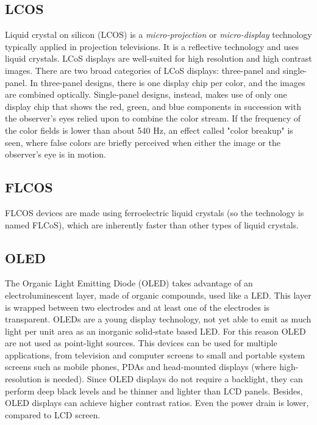 \subsection{LCOS}
Liquid crystal on silicon (LCOS) is a {\it micro-projection} or 
{\it micro-display} technology typically applied in projection 
televisions. It is a reflective technology and uses liquid crystals.
%
LCoS displays are well-suited for high resolution and high contrast 
images. 
%
There are two broad categories of LCoS displays: three-panel and 
single-panel. In three-panel designs, there is one display chip 
per color, and the images are combined optically. Single-panel 
designs, instead, makes use of only one display chip  that shows 
the red, green, and blue components in succession with the 
observer's eyes relied upon to combine the color stream. 
%
If the frequency of the color fields is lower than about 540 Hz, 
an effect called "color breakup" is seen, where false colors 
are briefly perceived when either the image or the observer's 
eye is in motion.
%

%
\subsection{FLCOS}
FLCOS devices are made using ferroelectric liquid crystals 
(so the technology is named FLCoS), which are inherently faster 
than other types of liquid crystals.
%

%
\subsection{OLED}
The Organic Light Emitting Diode (OLED) takes advantage of an 
electroluminescent layer, made of organic compounds, used 
like a LED. This layer is wrapped between two electrodes and 
at least one of the electrodes is transparent.
%
OLEDs are a young display technology, not yet able to emit as 
much light per unit area as an inorganic solid-state based LED. 
For this reason OLED are not used as point-light sources.
%
This devices can be used for multiple applications, from 
television and computer screens to small and portable system 
screens such as mobile phones, PDAs and head-mounted displays 
(where high-resolution is needed).
%
Since OLED displays do not require a backlight, they can 
perform deep black levels and be thinner and lighter than 
LCD panels. Besides, OLED displays can achieve higher contrast 
ratios. Even the power drain is lower, compared to LCD screen.
%

%
